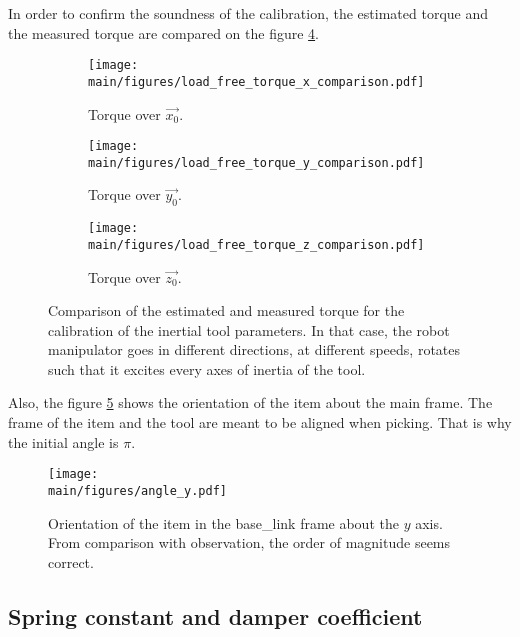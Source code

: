 \documentclass[/home/francois/latex/report/main.tex]{subfiles}
\begin{document}
In order to confirm the soundness of the calibration, the estimated torque and the measured torque are compared on the figure \ref{fig:results:calibration:torque}.

\begin{figure}[h]
\centering
\begin{subfigure}{0.49\textwidth}
\centering
\texttt{[image: \\main/figures/load\_free\_torque\_x\_comparison.pdf]}
\caption{Torque over $\overrightarrow{x_0}$.}
\label{fig:results:calibration:torque-x}
\end{subfigure}
\begin{subfigure}{0.49\textwidth}
\centering
\texttt{[image: \\main/figures/load\_free\_torque\_y\_comparison.pdf]}
\caption{Torque over $\overrightarrow{y_0}$.}
\label{fig:results:calibration:torque-y}
\end{subfigure}
\begin{subfigure}{0.51\textwidth}
\centering
\texttt{[image: \\main/figures/load\_free\_torque\_z\_comparison.pdf]}
\caption{Torque over $\overrightarrow{z_0}$.}
\label{fig:results:calibration:torque-z}
\end{subfigure}
\caption{Comparison of the estimated and measured torque for the calibration of the inertial tool parameters. In that case, the robot manipulator goes in different directions, at different speeds, rotates such that it excites every axes of inertia of the tool. \label{fig:results:calibration:torque}}
\end{figure}

Also, the figure \ref{fig:results:calibration:angle} shows the orientation of the item about the main frame. The frame of the item and the tool are meant to be aligned when picking. That is why the initial angle is $\pi$.

\begin{figure}[h]
  \centering
  \texttt{[image: \\main/figures/angle\_y.pdf]}
  \caption{Orientation of the item in the base\_link frame about the $y$ axis. From comparison with observation, the order of magnitude seems correct.}
  \label{fig:results:calibration:angle}
\end{figure}

\subsection{Spring constant and damper coefficient}
\end{document}

